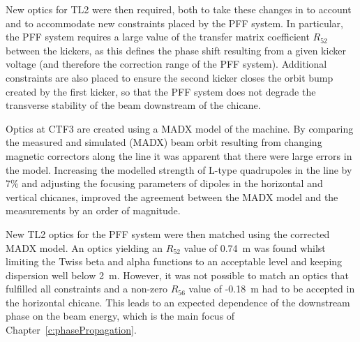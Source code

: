 New optics for TL2 were then required, both to take these changes in to account and to accommodate new constraints placed by the PFF system. In particular, the PFF system requires a large value of the transfer matrix coefficient \(R_{52}\) between the kickers, as this defines the phase shift resulting from a given kicker voltage (and therefore the correction range of the PFF system). Additional constraints are also placed to ensure the second kicker closes the orbit bump created by the first kicker, so that the PFF system does not degrade the transverse stability of the beam downstream of the chicane.

Optics at CTF3 are created using a MADX model of the machine. By comparing the measured and simulated (MADX) beam orbit resulting from changing magnetic correctors along the line it was apparent that there were large errors in the model.  Increasing the modelled strength of L-type quadrupoles in the line by 7\% and adjusting the focusing parameters of dipoles in the horizontal and vertical chicanes, improved the agreement between the MADX model and the measurements by an order of magnitude.

New TL2 optics for the PFF system were then matched using the corrected MADX model. An optics yielding an \(R_{52}\) value of 0.74~m was found whilst limiting the Twiss beta and alpha functions to an acceptable level and keeping dispersion well below 2~m. However, it was not possible to match an optics that fulfilled all constraints and a non-zero \(R_{56}\) value of -0.18~m had to be accepted in the horizontal chicane. This leads to an expected dependence of the downstream phase on the beam energy, which is the main focus of Chapter~\ref{c:phasePropagation}.